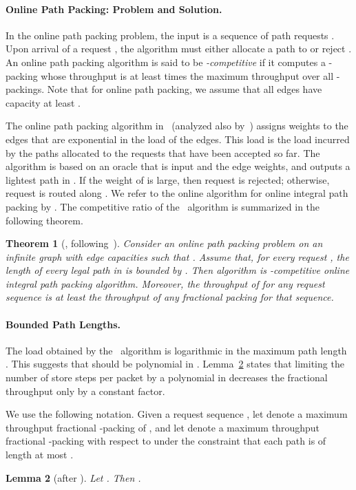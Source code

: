 \documentclass[11pt]{article}
\newtheorem{theorem}{Theorem}
\newtheorem{lemma}[theorem]{Lemma}
\newcommand{\route}{\text{\sc{ipp}}\xspace}
\newcommand{\IPP}{\route}
\newenvironment{proof sketch}[1]{\noindent {\emph{Proof sketch of #1:}}}{\hfill \qed}
\begin{document}
\paragraph{Online Path Packing: Problem and Solution\ifnum{}.\fi}
In the
online path packing problem, the input is a sequence of
path requests .  Upon arrival of a
request , the algorithm must either allocate a path
 to  or reject .  An online path
packing algorithm is said to be
\emph{-competitive} if it computes a
-packing whose throughput is at least 
times the maximum throughput over all -packings. Note
that for online path packing, we assume that all edges have
capacity at least .

The online path packing algorithm in~\cite{AAP} (analyzed also by~\cite{BN06})
assigns weights to the edges that are exponential in the load of the edges. This load
is the load incurred by the paths allocated to the requests that have been accepted
so far. The algorithm is based on an oracle that is input  and the edge weights,
and outputs a lightest path  in . If the weight of  is large, then
request  is rejected; otherwise, request  is routed along .
We refer to the online algorithm for online integral path packing by
.
The competitive ratio of the \route\ algorithm is summarized in the following theorem.
\begin{theorem}[\cite{EM14}, following~\cite{AAP, BN06}]
\label{thm:IPP}\sloppy Consider an online path packing
problem on an infinite graph with edge capacities such that .
Assume that, for every request , the length of every legal path in  is
bounded by .  Then algorithm  is -competitive online integral path packing algorithm.  Moreover, the
throughput of  for any request sequence is at least  the throughput of
any fractional packing for that sequence.
\end{theorem}

\paragraph{Bounded Path Lengths\ifnum{}.\fi}
The load obtained by the \IPP\ algorithm is logarithmic in the maximum path length
. This suggests that  should be polynomial in .
Lemma~\ref{lemma:nB} states that limiting the number of store steps per packet by a
polynomial in  decreases the fractional throughput only by a constant factor.

We use the following notation. Given a request sequence , let
 denote a maximum throughput fractional -packing of , and let
 denote a maximum throughput fractional -packing with respect to
 under the constraint that each path is of length at most .
\begin{lemma}[after \cite{AZ}]\label{lemma:nB}
  Let .  Then .
\end{lemma}
\end{document}
